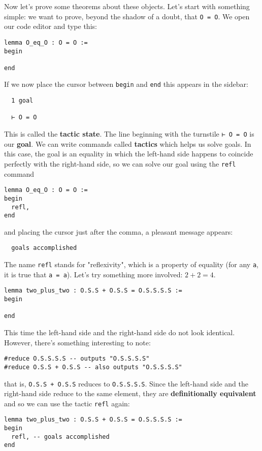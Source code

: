\documentclass{book}
\theoremstyle{definition}
\theoremstyle{remark}
\theoremstyle{plain}
\begin{document}
Now let's prove some theorems about these objects.
Let's start with something simple: we want to prove,
beyond the shadow of a doubt, that \lstinline{O = O}.
We open our code editor and type this:
\begin{lstlisting}
lemma O_eq_O : O = O :=
begin

end
\end{lstlisting}
If we now place the cursor between \lstinline{begin} and \lstinline{end}
this appears in the sidebar:
\begin{lstlisting}
  1 goal
  
  ⊢ O = O
\end{lstlisting}
This is called the \textbf{tactic state}.
The line beginning with the turnstile \lstinline{⊢ O = O} is our \textbf{goal}.
We can write commands called \textbf{tactics} which helps us solve goals.
In this case, the goal is an equality in which the left-hand side happens to coincide perfectly with the right-hand side,
so we can solve our goal using the \lstinline{refl} command
\begin{lstlisting}
lemma O_eq_O : O = O :=
begin
  refl,
end
\end{lstlisting}
and placing the cursor just after the comma, a pleasant message appears:
\begin{lstlisting}
  goals accomplished
\end{lstlisting}
The name \lstinline{refl} stands for "reflexivity",
which is a property of equality (for any \lstinline{a}, it is true that \lstinline{a = a}).
Let's try something more involved: $2 + 2 = 4$.
\begin{lstlisting}
lemma two_plus_two : O.S.S + O.S.S = O.S.S.S.S :=
begin

end
\end{lstlisting}
This time the left-hand side and the right-hand side do not look identical.
However, there's something interesting to note:
\begin{lstlisting}
#reduce O.S.S.S.S -- outputs "O.S.S.S.S"
#reduce O.S.S + O.S.S -- also outputs "O.S.S.S.S"
\end{lstlisting}
that is, \lstinline{O.S.S + O.S.S} reduces to \lstinline{O.S.S.S.S}.
Since the left-hand side and the right-hand side reduce to the same element,
they are \textbf{definitionally equivalent} and so we can use the tactic \lstinline{refl} again:
\begin{lstlisting}
lemma two_plus_two : O.S.S + O.S.S = O.S.S.S.S :=
begin
  refl, -- goals accomplished
end
\end{lstlisting}
\end{document}
